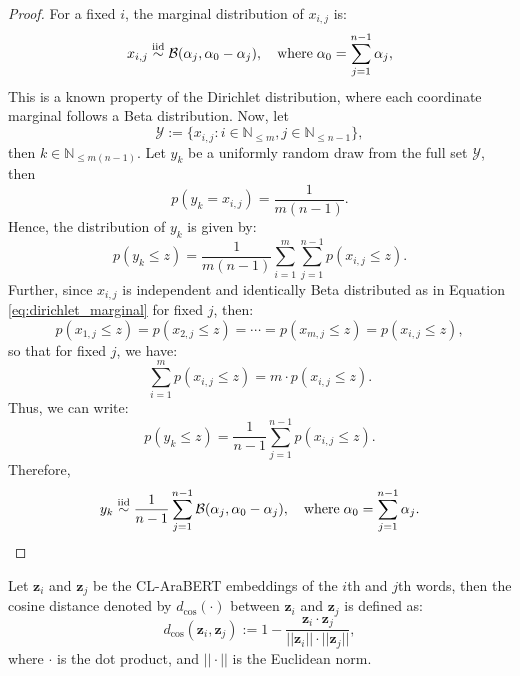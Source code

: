 \begin{proof}
    For a fixed $i$, the marginal distribution of $x_{i,j}$ is:
    \begin{equation}\label{eq:dirichlet_marginal}
        x_{i,j}\overset{\textnormal{iid}}{\sim}\mathcal{B}(\alpha_j,\alpha_0-\alpha_j),\quad\text{where}\;\alpha_0=\sum_{j=1}^{n-1}\alpha_j,
    \end{equation}
    This is a known property of the Dirichlet distribution, where each coordinate marginal follows a Beta distribution. Now, let 
    \begin{equation}
        \mathcal{Y}:=\{x_{i,j}:i\in\mathbb{N}_{\leq m}, j\in\mathbb{N}_{\leq n-1}\},
    \end{equation}
    then $k\in\mathbb{N}_{\leq m(n-1)}$. Let $y_k$ be a uniformly random draw from the full set $\mathcal{Y}$, then 
    \begin{equation}
        p(y_k=x_{i,j})=\frac{1}{m(n-1)}.
    \end{equation}
    Hence, the distribution of $y_k$ is given by:
    \begin{equation}
        p(y_k\leq z)=\frac{1}{m(n-1)}\sum_{i=1}^m\sum_{j=1}^{n-1}p(x_{i,j}\leq z).
    \end{equation}
    Further, since $x_{i,j}$ is independent and identically Beta distributed as in Equation \ref{eq:dirichlet_marginal} for fixed $j$, then:
    \begin{equation}
        p(x_{1,j}\leq z)=p(x_{2,j}\leq z)=\cdots=p(x_{m,j}\leq z)=p(x_{i,j}\leq z),
    \end{equation}
    so that for fixed $j$, we have:
    \begin{equation}
        \sum_{i=1}^m p(x_{i,j}\leq z)=m\cdot p(x_{i,j}\leq z).
    \end{equation}
    Thus, we can write:
    \begin{equation}
        p(y_k\leq z)=\frac{1}{n-1}\sum_{j=1}^{n-1}p(x_{i,j}\leq z).
    \end{equation}
    Therefore,
    \begin{equation}
        y_k\overset{\textnormal{iid}}{\sim}\frac{1}{n-1}\sum_{j=1}^{n-1}\mathcal{B}(\alpha_j,\alpha_0-\alpha_j),\quad\text{where}\;\alpha_0=\sum_{j=1}^{n-1}\alpha_j.
    \end{equation}
\end{proof}
\begin{defn}
    Let $\mathbf{z}_i$ and $\mathbf{z}_j$ be the CL-AraBERT embeddings of the $i$th and $j$th words, then the cosine distance denoted by $d_{\cos}(\cdot)$ between $\mathbf{z}_i$ and $\mathbf{z}_j$ is defined as:
    \begin{equation}
        d_{\cos}(\mathbf{z}_i,\mathbf{z}_j):=1-\frac{\mathbf{z}_i\cdot\mathbf{z}_j}{||\mathbf{z}_i||\cdot||\mathbf{z}_j||},
    \end{equation}
    where $\cdot$ is the dot product, and $||\cdot||$ is the Euclidean norm.
\end{defn}
